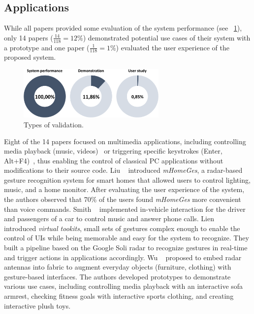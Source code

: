 \subsection{Applications} \label{sec:state_of_the_art:radar:applications}
While all papers provided some evaluation of the system performance (see \fig~\ref{fig:state_of_the_art:radar:validation-type}), only 14 papers ($\frac{14}{118}{=}12\%$) demonstrated potential use cases of their system with a prototype and one paper ($\frac{1}{118}{=}1\%$) evaluated the user experience of the proposed system.

\begin{figure}[hbt]
    \centering
    \includegraphics[height=2.6cm]{Figures/StateOfTheArt/Radar/evaluation-type.pdf}
    \caption{Types of validation.}
    \label{fig:state_of_the_art:radar:validation-type}
\end{figure}


Eight of the 14 papers focused on multimedia applications, including controlling media playback (\eg music, videos)~\cite{Du:2019,Lee:2020,Wu:2020,Smith:2018,Liu:2020b} or triggering specific keystrokes (\eg Enter, Alt+F4)~\cite{Nguyen:2018a,Nguyen:2018b}, thus enabling the control of classical PC applications without modifications to their source code.
Liu \etal~\cite{Liu:2020b} introduced \textit{mHomeGes}, a radar-based gesture recognition system for smart homes that allowed users to control lighting, music, and a home monitor. After evaluating the user experience of the system, the authors observed that 70\% of the users found \textit{mHomeGes} more convenient than voice commands.
Smith \etal~\cite{Smith:2018} implemented in-vehicle interaction for the driver and passengers of a car to control music and answer phone calls.
Lien \etal~\cite{Lien:2016} introduced \textit{virtual tookits}, \ie small sets of gestures complex enough to enable the control of UIs while being memorable and easy for the system to recognize. They built a pipeline based on the Google Soli radar to recognize gestures in real-time and trigger actions in applications accordingly.
Wu \etal~\cite{Wu:2020} proposed to embed radar antennas into fabric to augment everyday objects (\eg furniture, clothing) with gesture-based interfaces. The authors developed prototypes to demonstrate various use cases, including controlling media playback with an interactive sofa armrest, checking fitness goals with interactive sports clothing, and creating interactive plush toys.

